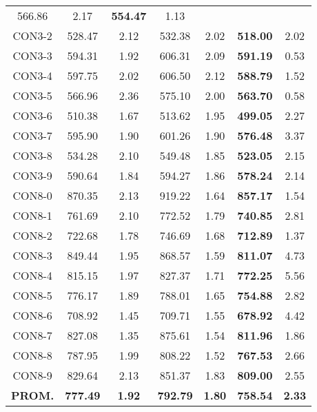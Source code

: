 \begin{table}[ht]
\begin{tabular}{c c c c c c c}
566.86 & 2.17 & \bf{554.47} & 
1.13\\CON3-2 & 528.47 & 2.12 & 
532.38 & 2.02 & \bf{518.00} & 
2.02\\CON3-3 & 594.31 & 1.92 & 
606.31 & 2.09 & \bf{591.19} & 
0.53\\CON3-4 & 597.75 & 2.02 & 
606.50 & 2.12 & \bf{588.79} & 
1.52\\CON3-5 & 566.96 & 2.36 & 
575.10 & 2.00 & \bf{563.70} & 
0.58\\CON3-6 & 510.38 & 1.67 & 
513.62 & 1.95 & \bf{499.05} & 
2.27\\CON3-7 & 595.90 & 1.90 & 
601.26 & 1.90 & \bf{576.48} & 
3.37\\CON3-8 & 534.28 & 2.10 & 
549.48 & 1.85 & \bf{523.05} & 
2.15\\CON3-9 & 590.64 & 1.84 & 
594.27 & 1.86 & \bf{578.24} & 
2.14\\CON8-0 & 870.35 & 2.13 & 
919.22 & 1.64 & \bf{857.17} & 
1.54\\CON8-1 & 761.69 & 2.10 & 
772.52 & 1.79 & \bf{740.85} & 
2.81\\CON8-2 & 722.68 & 1.78 & 
746.69 & 1.68 & \bf{712.89} & 
1.37\\CON8-3 & 849.44 & 1.95 & 
868.57 & 1.59 & \bf{811.07} & 
4.73\\CON8-4 & 815.15 & 1.97 & 
827.37 & 1.71 & \bf{772.25} & 
5.56\\CON8-5 & 776.17 & 1.89 & 
788.01 & 1.65 & \bf{754.88} & 
2.82\\CON8-6 & 708.92 & 1.45 & 
709.71 & 1.55 & \bf{678.92} & 
4.42\\CON8-7 & 827.08 & 1.35 & 
875.61 & 1.54 & \bf{811.96} & 
1.86\\CON8-8 & 787.95 & 1.99 & 
808.22 & 1.52 & \bf{767.53} & 
2.66\\CON8-9 & 829.64 & 2.13 & 
851.37 & 1.83 & \bf{809.00} & 
2.55\\\bf{PROM.} & 
\bf{777.49} & \bf{1.92} & \bf{792.79} & \bf{1.80} & \bf{758.54} & \bf{2.33}\\[1ex]\hline
\end{tabular}
\label{table:nonlin}
\end{table} \clearpage
